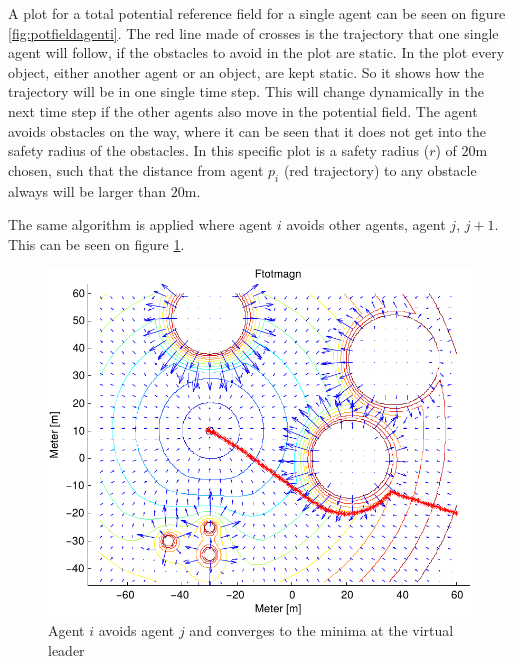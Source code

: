 \documentclass[a4paper,conference]{IEEEtran}
\begin{document}
A plot for a total potential reference field for a single agent can be
seen on figure \ref{fig:potfieldagenti}. The red line made of crosses
is the trajectory that one single agent will follow, if the obstacles
to avoid in the plot are static. In the plot every object, either
another agent or an object, are kept static. So it shows how the
trajectory will be in one single time step. This will change dynamically in the
next time step if the other agents also move in the potential field.
The agent avoids obstacles on the way, where it can be seen that it
does not get into the safety radius of the obstacles. In this specific
plot is a safety radius ($r$) of $20$m chosen, such that the distance
from agent $p_i$ (red trajectory) to any obstacle always will be
larger than $20$m.


The same algorithm is applied where agent $i$ avoids other agents,
agent $j$, $j+1$. This can be seen on figure \ref{fig:avoidagent}.

\begin{figure}[htbp]
  \includegraphics[width=\linewidth]{fig/ftotmagnfigpdf}
	\caption{Agent $i$ avoids agent $j$ and converges to the minima at
		the virtual leader}
  \label{fig:avoidagent}
\end{figure}
\end{document}
